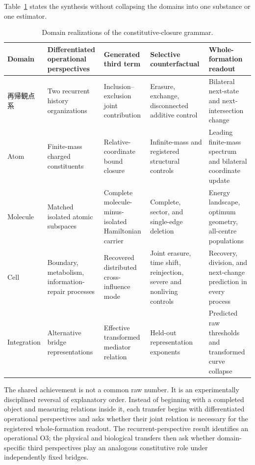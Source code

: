 \documentclass[11pt,a4paper]{article}
\begin{document}
Table~\ref{tab:cross-domain-map} states the synthesis without collapsing the domains into one substance or one estimator.

\begin{table}[H]
\centering
\scriptsize
\caption{Domain realizations of the constitutive-closure grammar.}
\label{tab:cross-domain-map}
\begin{tabularx}{\textwidth}{@{}>{\raggedright\arraybackslash}p{1.45cm}>{\raggedright\arraybackslash}p{3.05cm}>{\raggedright\arraybackslash}p{3.25cm}>{\raggedright\arraybackslash}p{3.25cm}>{\raggedright\arraybackslash}X@{}}
\toprule
Domain & Differentiated operational perspectives & Generated third term & Selective counterfactual & Whole-formation readout \\
\midrule
再帰観点系 & Two recurrent history organizations & Inclusion--exclusion joint contribution & Erasure, exchange, disconnected additive control & Bilateral next-state and next-intersection change \\
Atom & Finite-mass charged constituents & Relative-coordinate bound closure & Infinite-mass and registered structural controls & Leading finite-mass spectrum and bilateral coordinate update \\
Molecule & Matched isolated atomic subspaces & Complete molecule-minus-isolated Hamiltonian carrier & Complete, sector, and single-edge deletion & Energy landscape, optimum geometry, all-centre populations \\
Cell & Boundary, metabolism, information-repair processes & Recovered distributed cross-influence mode & Joint erasure, time shift, reinjection, severe and nonliving controls & Recovery, division, and next-change prediction in every process \\
Integration & Alternative bridge representations & Effective transformed mediator relation & Held-out representation exponents & Predicted raw thresholds and transformed curve collapse \\
\bottomrule
\end{tabularx}
\end{table}

The shared achievement is not a common raw number. It is an experimentally disciplined reversal of explanatory order. Instead of beginning with a completed object and measuring relations inside it, each transfer begins with differentiated operational perspectives and asks whether their joint relation is necessary for the registered whole-formation readout. The recurrent-perspective result identifies an operational O3; the physical and biological transfers then ask whether domain-specific third perspectives play an analogous constitutive role under independently fixed bridges.
\end{document}
